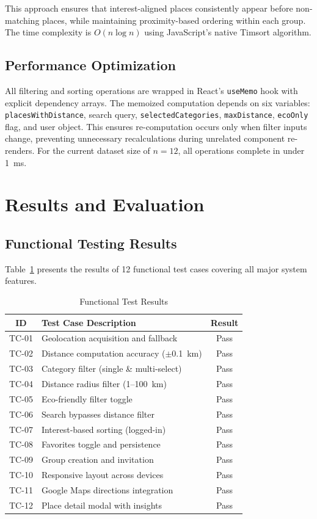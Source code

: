 \documentclass[conference]{IEEEtran}
\begin{document}
This approach ensures that interest-aligned places consistently appear before non-matching places, while maintaining proximity-based ordering within each group. The time complexity is $O(n \log n)$ using JavaScript's native Timsort algorithm.

\subsection{Performance Optimization}

All filtering and sorting operations are wrapped in React's \texttt{useMemo} hook with explicit dependency arrays. The memoized computation depends on six variables: \texttt{placesWithDistance}, search query, \texttt{selectedCategories}, \texttt{maxDistance}, \texttt{ecoOnly} flag, and user object. This ensures re-computation occurs only when filter inputs change, preventing unnecessary recalculations during unrelated component re-renders. For the current dataset size of $n=12$, all operations complete in under 1~ms.

\section{Results and Evaluation}

\subsection{Functional Testing Results}

Table~\ref{tab:testing} presents the results of 12 functional test cases covering all major system features.

\begin{table}[htbp]
\caption{Functional Test Results}
\label{tab:testing}
\centering
\begin{tabular}{clc}
\toprule
\textbf{ID} & \textbf{Test Case Description} & \textbf{Result} \\
\midrule
TC-01 & Geolocation acquisition and fallback & Pass \\
TC-02 & Distance computation accuracy ($\pm$0.1~km) & Pass \\
TC-03 & Category filter (single \& multi-select) & Pass \\
TC-04 & Distance radius filter (1--100~km) & Pass \\
TC-05 & Eco-friendly filter toggle & Pass \\
TC-06 & Search bypasses distance filter & Pass \\
TC-07 & Interest-based sorting (logged-in) & Pass \\
TC-08 & Favorites toggle and persistence & Pass \\
TC-09 & Group creation and invitation & Pass \\
TC-10 & Responsive layout across devices & Pass \\
TC-11 & Google Maps directions integration & Pass \\
TC-12 & Place detail modal with insights & Pass \\
\bottomrule
\end{tabular}
\end{table}
\end{document}
